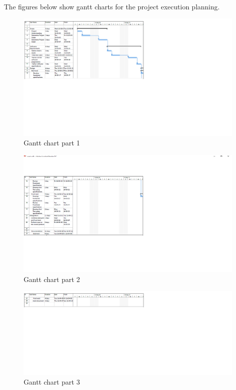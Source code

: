 \documentclass[10pt,onecolumn]{MainDocument}
\begin{document}
The figures below show gantt charts for the project execution planning. 
  
\begin{center}
\begin{figure}[h]
\centering
\includegraphics[trim = {0 10cm 14cm 0},clip, scale=0.58]{gantt1}
\caption{Gantt chart part 1}
\end{figure}
\end{center}


\begin{center}
\begin{figure}[h]
\centering
\includegraphics[trim = {0 6cm 14cm 2cm},clip, scale=0.58]{gantt2}
\caption{Gantt chart part 2}
\end{figure}
\end{center}


\begin{center}
\begin{figure}[h]
\centering
\includegraphics[trim = {0 11cm 14cm 0},clip, scale=0.58]{gantt3}
\caption{Gantt chart part 3}
\end{figure}
\end{center}
\end{document}
